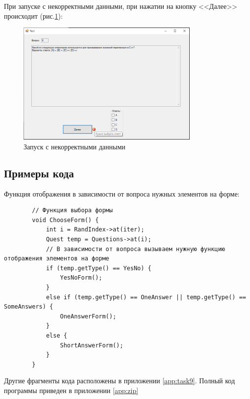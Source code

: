При запуске с некорректными данными, при нажатии на кнопку <<Далее>> происходит (рис.\ref{fig:BadInputNotIntForm9}):

\newpage

\begin{figure}[!h]
    \centering
    \includegraphics[width = 0.8\textwidth]{images/Task9/OneAnswerBadInput.png}
    \caption{Запуск с некорректными данными}
    \label{fig:BadInputNotIntForm9}
\end{figure}

\subsection{Примеры кода}

Функция отображения в зависимости от вопроса нужных элементов на форме:

\begin{verbatim}
		// Функция выбора формы
		void ChooseForm() {
			int i = RandIndex->at(iter);
			Quest temp = Questions->at(i);
			// В зависимости от вопроса вызываем нужную функцию отображения элементов на форме
			if (temp.getType() == YesNo) {
				YesNoForm();
			}
			else if (temp.getType() == OneAnswer || temp.getType() == SomeAnswers) {
				OneAnswerForm();
			}
			else {
				ShortAnswerForm();
			}
		}
\end{verbatim}

Другие фрагменты кода расположены в приложении \ref{app:task9}. Полный код программы приведен в приложении \ref{app:zip}
